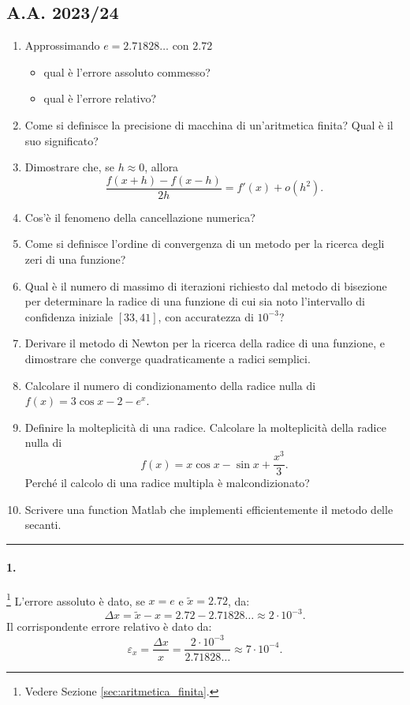 \subsection{A.A. 2023/24}
\begin{enumerate}
	\item Approssimando $e=2.71828\hdots$ con $2.72$
	\begin{itemize}
		\item qual è l'errore assoluto commesso?
		\item qual è l'errore relativo?
	\end{itemize}
	\item Come si definisce la precisione di macchina di un'aritmetica finita? Qual è il suo significato?
	\item Dimostrare che, se $h\approx 0$, allora
	\begin{equation*}
		\frac{f(x+h)-f(x-h)}{2h}=f'(x)+o(h^2).
	\end{equation*}
	\item Cos'è il fenomeno della cancellazione numerica?
	\item Come si definisce l'ordine di convergenza di un metodo per la ricerca degli zeri di una funzione?
	\item Qual è il numero di massimo di iterazioni richiesto dal metodo di bisezione per determinare la radice di una funzione di cui sia noto l'intervallo di confidenza iniziale $[33,41]$, con accuratezza di $10^{-3}$?
	\item Derivare il metodo di Newton per la ricerca della radice di una funzione, e dimostrare che converge quadraticamente a radici semplici.
	\item Calcolare il numero di condizionamento della radice nulla di $f(x)=3\cos x-2-e^x$.
	\item Definire la molteplicità di una radice. Calcolare la molteplicità della radice nulla di
	\begin{equation*}
		f(x)=x\cos x - \sin x + \frac{x^3}{3}.
	\end{equation*}
	Perché il calcolo di una radice multipla è malcondizionato?
	\item Scrivere una function Matlab che implementi efficientemente il metodo	delle secanti.
\end{enumerate}

\hrule

\paragraph{1.}\footnote{Vedere Sezione \ref{sec:aritmetica_finita}.} L'errore assoluto è dato, se $x=e$ e $\tilde x=2.72$, da:
\begin{equation*}
	\Delta x=\tilde x - x = 2.72 - 2.71828\hdots \approx 2\cdot 10^{-3}.
\end{equation*}
Il corrispondente errore relativo è dato da:
\begin{equation*}
	\varepsilon_x = \frac{\Delta x}{x} = \frac{2 \cdot10^{-3}}{2.71828\hdots}\approx 7\cdot 10^{-4}.
\end{equation*}

